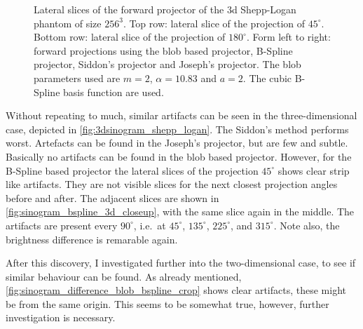 \begin{figure}
	\caption{Lateral slices of the forward projector of the \(3\)d Shepp-Logan phantom of size
		\(256^3\). Top row: lateral slice of the projection of \(45^\circ\). Bottom row:
		lateral slice of the projection of \(180^\circ\). Form left to right: forward
		projections using the blob based projector, B-Spline projector, Siddon's projector
		and Joseph's projector. The blob parameters used are \(m=2\), \(\alpha=10.83\) and
		\(a=2\). The cubic B-Spline basis function are used.
	}\label{fig:3dsinogram_shepp_logan}
\end{figure}

Without repeating to much, similar artifacts can be seen in the three-dimensional case, depicted in
\autoref{fig:3dsinogram_shepp_logan}. The Siddon's method performs worst. Artefacts can be found in
the Joseph's projector, but are few and subtle. Basically no artifacts can be found in the blob
based projector. However, for the B-Spline based projector the lateral slices of the projection
\(45^\circ\) shows clear strip like artifacts. They are not visible slices for the next closest
projection angles before and after. The adjacent slices are shown in
\autoref{fig:sinogram_bspline_3d_closeup}, with the same slice again in the middle. The artifacts
are present every \(90^\circ\), i.e.\ at \(45^\circ\), \(135^\circ\), \(225^\circ\), and
\(315^\circ\). Note also, the brightness difference is remarable again.

After this discovery, I investigated further into the two-dimensional case, to see if similar
behaviour can be found. As already mentioned, \autoref{fig:sinogram_difference_blob_bspline_crop}
shows clear artifacts, these might be from the same origin. This seems to be somewhat true, however,
further investigation is necessary.

